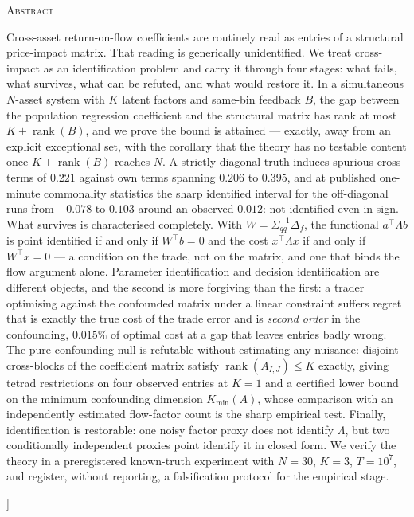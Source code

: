 \documentclass[10pt,twocolumn]{article}
\theoremstyle{remark}
\newcommand{\rank}{\operatorname{rank}}
\begin{document}
\begin{@twocolumnfalse}
\vspace{13pt}
\begin{center}
\begin{minipage}{0.895\textwidth}
\centerline{\textsc{Abstract}}
\vspace{4pt}
\normalsize
Cross-asset return-on-flow coefficients are routinely read as entries of a
structural price-impact matrix. That reading is generically unidentified. We
treat cross-impact as an identification problem and carry it through four
stages: what fails, what survives, what can be refuted, and what would restore
it. In a simultaneous $N$-asset system with $K$ latent factors and same-bin
feedback $B$, the gap between the population regression coefficient and the
structural matrix has rank at most $K+\rank(B)$, and we prove the bound is
attained --- exactly, away from an explicit exceptional set, with the corollary
that the theory has no testable content once $K+\rank(B)$ reaches $N$. A
strictly diagonal truth induces spurious cross terms of $0.221$ against own
terms spanning $0.206$ to $0.395$, and at published one-minute commonality
statistics the sharp identified interval for the off-diagonal runs from
$-0.078$ to $0.103$ around an observed $0.012$: not identified even in sign.
What survives is characterised completely. With
$W=\Sigma_{qq}^{-1}\Delta_f$, the functional $a^\top\Lambda b$ is point
identified if and only if $W^\top b=0$ and the cost $x^\top\Lambda x$ if and
only if $W^\top x=0$ --- a condition on the trade, not on the matrix, and one
that binds the flow argument alone. Parameter identification and decision
identification are different objects, and the second is more forgiving than the
first: a trader optimising against the confounded matrix under a linear
constraint suffers regret that is exactly the true cost of the trade error and
is \emph{second order} in the confounding, $0.015\%$ of optimal cost at a gap
that leaves entries badly wrong. The pure-confounding null is refutable without
estimating any nuisance: disjoint cross-blocks of the coefficient matrix
satisfy $\rank(A_{I,J})\le K$ exactly, giving tetrad restrictions on four
observed entries at $K=1$ and a certified lower bound on the minimum
confounding dimension $K_{\min}(A)$, whose comparison with an independently
estimated flow-factor count is the sharp empirical test. Finally, identification
is restorable: one noisy factor proxy does not identify $\Lambda$, but two
conditionally independent proxies point identify it in closed form. We verify
the theory in a preregistered known-truth experiment with $N=30$, $K=3$,
$T=10^{7}$, and register, without reporting, a falsification protocol for the
empirical stage.
\end{minipage}
\end{center}

\vspace{12pt}
\end{@twocolumnfalse}
]
\end{document}
